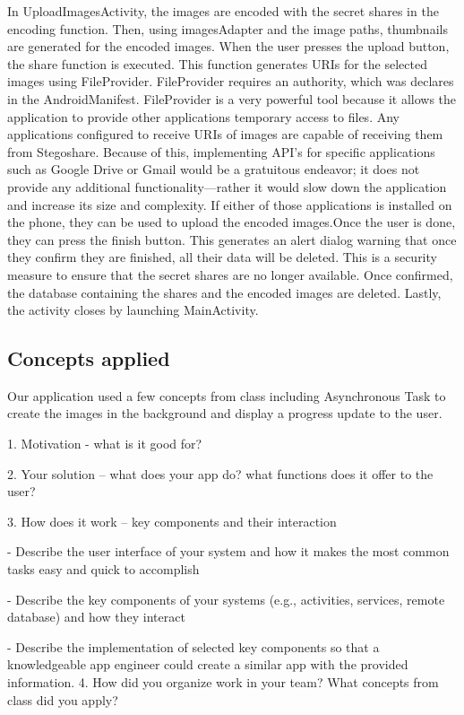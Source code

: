 	In UploadImagesActivity, the images are encoded with the secret shares in the encoding function. Then, using imagesAdapter and the image paths, thumbnails are generated for the encoded images. When the user presses the upload button, the share function is executed. This function generates URIs for the selected images using FileProvider. FileProvider requires an authority, which was declares in the AndroidManifest.
FileProvider is a very powerful tool because it allows the application to provide other applications temporary access to files. Any applications configured to receive URIs of images are capable of receiving them from Stegoshare. Because of this, implementing API’s for specific applications such as Google Drive or Gmail would be a gratuitous endeavor; it does not provide any additional functionality—rather it would slow down the application and increase its size and complexity.
If either of those applications is installed on the phone, they can be used to upload the encoded images.Once the user is done, they can press the finish button. This generates an alert dialog warning that once they confirm they are finished, all their data will be deleted. This is a security measure to ensure that the secret shares are no longer available. Once confirmed, the database containing the shares and the encoded images are deleted. Lastly, the activity closes by launching MainActivity.


\subsection{Concepts applied}
Our application used a few concepts from class including Asynchronous Task to create the images in the background and display a progress update to the user.

1. Motivation - what is it good for?

2. Your solution – what does your app do? what functions does it offer to the user?

3. How does it work – key components and their interaction

 - Describe the user interface of your system and how it makes the most common tasks easy and quick to accomplish

 - Describe the key components of your systems (e.g., activities, services, remote database) and how they interact

 - Describe the implementation of selected key components so that a knowledgeable app engineer could create a similar app with the provided information.
4. How did you organize work in your team? What concepts from class did you apply?
